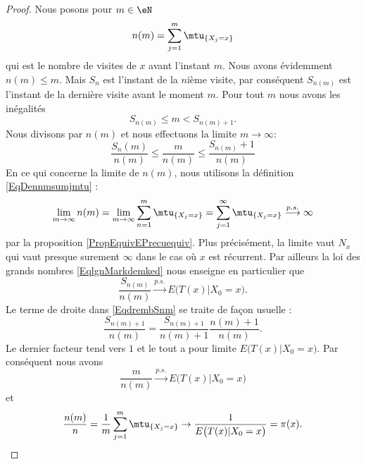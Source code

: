 \begin{proof}
	Nous posons pour \( m\in\eN\)
	\begin{equation}    \label{EqDennmsumjmtu}
		n(m)=\sum_{j=1}^m\mtu_{\{ X_j=x \}}
	\end{equation}
	qui est le nombre de visites de \( x\) avant l'instant \( m\). Nous avons évidemment \( n(m)\leq m\). Mais \( S_n\) est l'instant de la \( n\)ième visite, par conséquent \( S_{n(m)}\) est l'instant de la dernière visite avant le moment \( m\). Pour tout \( m\) nous avons les inégalités
	\begin{equation}
		S_{n(m)}\leq m<S_{n(m)+1}.
	\end{equation}
	Nous divisons par \( n(m)\) et nous effectuons la limite \( m\to\infty\):
	\begin{equation}    \label{EqdrembSnm}
		\frac{ S_n(m) }{ n(m) }\leq \frac{ m }{ n(m) }\leq\frac{ S_{n(m)}+1 }{ n(m) }
	\end{equation}
	En ce qui concerne la limite de \( n(m)\), nous utilisons la définition \eqref{EqDennmsumjmtu} :
	\begin{equation}
		\lim_{m\to \infty}  n(m)=\lim_{m\to \infty} \sum_{n=1}^m\mtu_{\{ X_j=x \}}=\sum_{j=1}^{\infty}\mtu_{\{ X_j=x \}}\stackrel{p.s.}{\longrightarrow}\infty
	\end{equation}
	par la proposition \ref{PropEquivEPrecuequiv}. Plus précisément, la limite vaut \( N_x\) qui vaut presque surement \( \infty\) dans le cas où \( x\) est récurrent. Par ailleurs la loi des grands nombres \eqref{EqlgnMarkdemked} nous enseigne en particulier que
	\begin{equation}
		\frac{ S_{n(m)} }{ n(m) }\stackrel{p.s.}{\longrightarrow} E\big( T(x)|X_0=x \big).
	\end{equation}
	Le terme de droite dans \eqref{EqdrembSnm} se traite de façon usuelle :
	\begin{equation}
		\frac{ S_{n(m)+1} }{ n(m) }=\frac{ S_{n(m)+1} }{ n(m)+1 }\frac{ n(m)+1 }{ n(m) }.
	\end{equation}
	Le dernier facteur tend vers \( 1\) et le tout a pour limite \( E\big( T(x)|X_0=x \big)\). Par conséquent nous avons
	\begin{equation}
		\frac{ m }{ n(m) }\stackrel{p.s.}{\longrightarrow}E\big( T(x)|X_0=x \big)
	\end{equation}
	et
	\begin{equation}
		\frac{ n(m) }{ n }=\frac{1}{ m }\sum_{j=1}^m\mtu_{\{ X_j=x \}}\to\frac{1}{ E\big( T(x)|X_0=x \big) }=\pi(x).
	\end{equation}
\end{proof}


